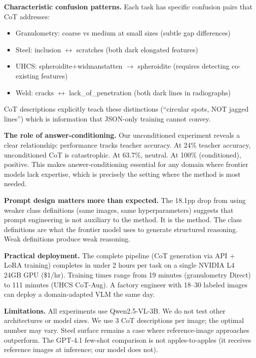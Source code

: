 \documentclass[11pt]{article}
\begin{document}
\textbf{Characteristic confusion patterns.} Each task has specific confusion pairs that CoT addresses:
\begin{itemize}
\item Granulometry: coarse vs medium at small sizes (subtle gap differences)
\item Steel: inclusion $\leftrightarrow$ scratches (both dark elongated features)
\item UHCS: spheroidite+widmanstatten $\rightarrow$ spheroidite (requires detecting co-existing features)
\item Weld: cracks $\leftrightarrow$ lack\_of\_penetration (both dark lines in radiographs)
\end{itemize}
CoT descriptions explicitly teach these distinctions (``circular spots, NOT jagged lines'') which is information that JSON-only training cannot convey.

\textbf{The role of answer-conditioning.} Our unconditioned experiment reveals a clear relationship: performance tracks teacher accuracy. At 24\% teacher accuracy, unconditioned CoT is catastrophic. At 63.7\%, neutral. At 100\% (conditioned), positive. This makes answer-conditioning essential for any domain where frontier models lack expertise, which is precisely the setting where the method is most needed.

\textbf{Prompt design matters more than expected.} The 18.1pp drop from using weaker class definitions (same images, same hyperparameters) suggests that prompt engineering is not auxiliary to the method. It is the method. The class definitions are what the frontier model uses to generate structured reasoning. Weak definitions produce weak reasoning.

\textbf{Practical deployment.} The complete pipeline (CoT generation via API + LoRA training) completes in under 2 hours per task on a single NVIDIA L4 24GB GPU (\$1/hr). Training times range from 19 minutes (granulometry Direct) to 111 minutes (UHCS CoT-Aug). A factory engineer with 18--30 labeled images can deploy a domain-adapted VLM the same day.

\textbf{Limitations.} All experiments use Qwen2.5-VL-3B. We do not test other architectures or model sizes. We use 3 CoT descriptions per image; the optimal number may vary. Steel surface remains a case where reference-image approaches outperform. The GPT-4.1 few-shot comparison is not apples-to-apples (it receives reference images at inference; our model does not).


\end{document}
